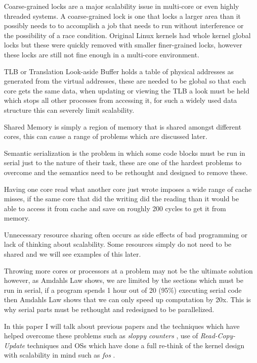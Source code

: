 \documentclass[journal]{IEEEtran}
\begin{document}
\vspace{5mm}

Coarse-grained locks are a major scalability issue in multi-core or even highly threaded systems. A coarse-grained lock is one that locks a larger area than it possibly needs to to accomplish a job that needs to run without interference or the possibility of a race condition. Original Linux kernels had whole kernel global locks but these were quickly removed with smaller finer-grained locks, however these locks are still not fine enough in a multi-core environment.

TLB or Translation Look-aside Buffer holds a table of physical addresses as generated from the virtual addresses, these are needed to be global so that each core gets the same data, when updating or viewing the TLB a look must be held which stops all other processes from accessing it, for such a widely used data structure this can severely limit scalability.

Shared Memory is simply a region of memory that is shared amongst different cores, this can cause a range of problems which are discussed later.

Semantic serialization is the problem in which some code blocks must be run in serial just to the nature of their task, these are one of the hardest problems to overcome and the semantics need to be rethought and designed to remove these.

Having one core read what another core just wrote imposes a wide range of cache misses, if the same core that did the writing did the reading than it would be able to access it from cache and save on roughly 200 cycles to get it from memory.

Unnecessary resource sharing often occurs as side effects of bad programming or lack of thinking about scalability. Some resources simply do not need to be shared and we will see examples of this later.

Throwing more cores or processors at a problem may not be the ultimate solution however, as Amdahls Law \cite{Amdahl} shows, we are limited by the sections which must be run in serial, if a program spends 1 hour out of 20 (95\%) executing serial code then Amdahls Law shows that we can only speed up computation by 20x. This is why serial parts must be rethought and redesigned to be parallelized.

In this paper I will talk about previous papers and the techniques which have helped overcome these problems such as \emph{sloppy counters} \cite{sloppy-counters}, use of \emph{Read-Copy-Update} \cite{RCU} techniques and OSs which have done a full re-think of the kernel design with scalability in mind such as \emph{fos} \cite{fos}.
\end{document}
